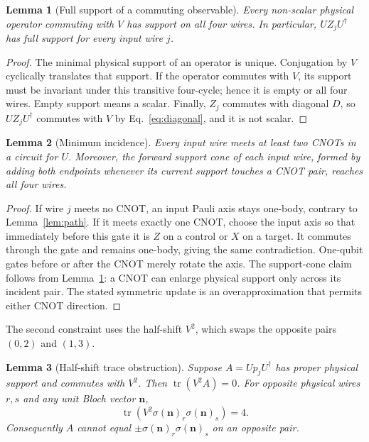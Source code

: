 \documentclass[11pt]{article}
\newtheorem{lemma}{Lemma}
\newcommand{\tr}{\operatorname{tr}}
\begin{document}
\begin{lemma}[Full support of a commuting observable]\label{lem:support}
Every non-scalar physical operator commuting with $V$ has support on all
four wires.  In particular, $UZ_jU^\dagger$ has full support for every
input wire $j$.
\end{lemma}

\begin{proof}
The minimal physical support of an operator is unique.  Conjugation by
$V$ cyclically translates that support.  If the operator commutes with
$V$, its support must be invariant under this transitive four-cycle; hence
it is empty or all four wires.  Empty support means a scalar.  Finally,
$Z_j$ commutes with diagonal $D$, so $UZ_jU^\dagger$ commutes with $V$ by
Eq.~\eqref{eq:diagonal}, and it is not scalar.
\end{proof}

\begin{lemma}[Minimum incidence]\label{lem:degree}
Every input wire meets at least two CNOTs in a circuit for $U$.
Moreover, the forward support cone of each input wire, formed by adding
both endpoints whenever its current support touches a CNOT pair, reaches
all four wires.
\end{lemma}

\begin{proof}
If wire $j$ meets no CNOT, an input Pauli axis stays one-body, contrary
to Lemma~\ref{lem:path}.  If it meets exactly one CNOT, choose the input
axis so that immediately before this gate it is $Z$ on a control or $X$
on a target.  It commutes through the gate and remains one-body, giving
the same contradiction.  One-qubit gates before or after the CNOT merely
rotate the axis.  The support-cone claim follows from
Lemma~\ref{lem:support}: a CNOT can enlarge physical support only across
its incident pair.  The stated symmetric update is an overapproximation
that permits either CNOT direction.
\end{proof}

The second constraint uses the half-shift $V^2$, which swaps the opposite
pairs $(0,2)$ and $(1,3)$.

\begin{lemma}[Half-shift trace obstruction]\label{lem:trace}
Suppose $A=Up_jU^\dagger$ has proper physical support and commutes with
$V^2$.  Then $\tr(V^2A)=0$.  For opposite physical wires $r,s$ and any
unit Bloch vector $\mathbf n$,
\begin{equation}\label{eq:trace-product}
\tr\!\left(V^2\sigma(\mathbf n)_r\sigma(\mathbf n)_s\right)=4.
\end{equation}
Consequently $A$ cannot equal
$\pm\sigma(\mathbf n)_r\sigma(\mathbf n)_s$ on an opposite pair.
\end{lemma}
\end{document}
